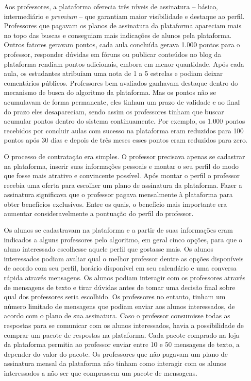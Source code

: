 \documentclass[portuguese]{textolivre}
\begin{document}
Aos professores, a plataforma oferecia três níveis de assinatura -- básico, intermediário e \textit{premium} -- que garantiam maior visibilidade e destaque ao perfil. Professores que pagavam os planos de assinatura da plataforma apareciam mais no topo das buscas e conseguiam mais indicações de alunos pela plataforma. Outros fatores geravam pontos, cada aula concluída gerava 1.000 pontos para o professor, responder dúvidas em fóruns ou publicar conteúdos no blog da plataforma rendiam pontos adicionais, embora em menor quantidade. Após cada aula, os estudantes atribuíam uma nota de 1 a 5 estrelas e podiam deixar comentários públicos. Professores bem avaliados ganhavam destaque dentro do mecanismo de busca do algoritmo da plataforma. Mas os pontos não se acumulavam de forma permanente, eles tinham um prazo de validade e ao final do prazo eles desapareciam, sendo assim os professores tinham que buscar acumular pontos dentro do sistema continuamente. Por exemplo, os 1.000 pontos recebidos por concluir aulas com sucesso na plataforma eram reduzidos para 100 pontos após 30 dias e depois de três meses esses pontos eram reduzidos para zero.

O processo de contratação era simples. O professor precisava apenas se cadastrar na plataforma, inserir suas informações pessoais e montar o seu perfil do modo que fosse mais atrativo e convincente possível. Após montar o perfil o professor recebia uma oferta para escolher um plano de assinatura da plataforma. Fazer a assinatura significava que o professor pagava mensalmente à plataforma para obter benefícios exclusivos. Entre os quais, o benefício mais importante era aumentar consideravelmente a pontuação do perfil do professor.

Os alunos se cadastravam na plataforma e a partir de suas informações eram indicados a alguns professores pelo algoritmo, em geral cinco opções, para que o aluno interessado escolhesse aquele perfil que gostasse mais. Os alunos interessados podiam avaliar qual o melhor professor dentre as opções disponíveis de acordo com seu perfil, horário disponível em seu calendário e uma conversa rápida através mensagens. Os alunos podiam interagir com os professores através de mensagens de texto e tirar dúvidas antes de tomar uma decisão final sobre qual dos professores seria escolhido. Os professores no entanto, tinham um número limitado de mensagens que podiam enviar aos alunos interessados, de acordo com o plano de sua assinatura. Caso o professor consumisse todas as respostas para se comunicar com os alunos interessados, havia a possibilidade de comprar um pacote de respostas na plataforma. Cada pacote comprado na loja da plataforma permitia ao professor enviar entre 10 e 50 mensagens de texto, a depender do valor do pacote. Os professores que não pagavam um plano de assinatura mensal da plataforma não tinham como interagir com os alunos interessados a não ser que comprassem um pacote de mensagens.
\end{document}
